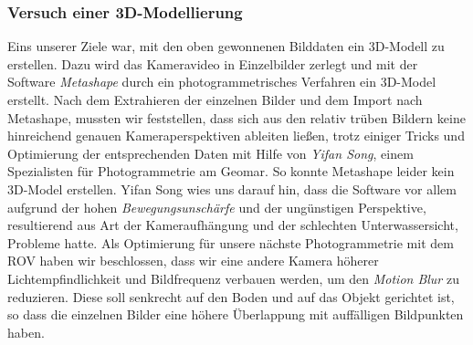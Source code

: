 \subsubsection{Versuch einer 3D-Modellierung}
Eins unserer Ziele war, mit den oben gewonnenen Bilddaten ein 3D-Modell zu erstellen. Dazu wird das Kameravideo in Einzelbilder zerlegt und mit der Software \emph{Metashape} durch ein photogrammetrisches Verfahren ein 3D-Model erstellt. 
Nach dem Extrahieren der einzelnen Bilder und dem Import nach Metashape, mussten wir feststellen, dass sich aus den relativ trüben Bildern keine hinreichend genauen Kameraperspektiven ableiten ließen, trotz einiger Tricks und Optimierung der entsprechenden Daten mit Hilfe von \emph{Yifan Song}, einem Spezialisten für Photogrammetrie am Geomar. So konnte Metashape leider kein 3D-Model erstellen.
Yifan Song wies uns darauf hin, dass die Software vor allem aufgrund der hohen \emph{Bewegungsunschärfe} und der ungünstigen Perspektive, resultierend aus Art der Kameraufhängung und der schlechten Unterwassersicht, Probleme hatte. 
Als Optimierung für unsere nächste Photogrammetrie mit dem ROV haben wir beschlossen, dass wir eine andere Kamera höherer Lichtempfindlichkeit und Bildfrequenz verbauen werden, um den \emph{Motion Blur} zu reduzieren. Diese soll senkrecht auf den Boden und auf das Objekt gerichtet ist, so dass die einzelnen Bilder eine höhere Überlappung mit auffälligen Bildpunkten haben.
\\


